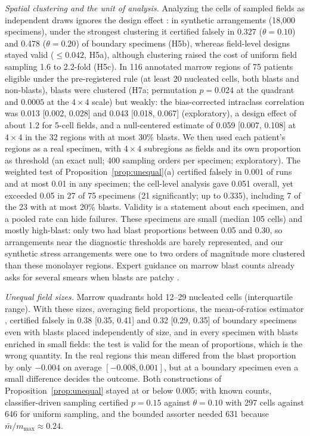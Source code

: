 \documentclass[journal]{IEEEtran}
\begin{document}
\emph{Spatial clustering and the unit of analysis.} Analyzing the cells of sampled fields as independent draws ignores the design effect \cite{kish1965}: in synthetic arrangements (18,000 specimens), under the strongest clustering it certified falsely in 0.327 ($\theta=0.10$) and 0.478 ($\theta=0.20$) of boundary specimens (H5b), whereas field-level designs stayed valid ($\le0.042$, H5a), although clustering raised the cost of uniform field sampling 1.6 to 2.2-fold (H5c). In 116 annotated marrow regions of 75 patients eligible under the pre-registered rule (at least 20 nucleated cells, both blasts and non-blasts), blasts were clustered (H7a; permutation $p=0.024$ at the quadrant and $0.0005$ at the $4\times4$ scale) but weakly: the bias-corrected intraclass correlation was 0.013 [0.002, 0.028] and 0.043 [0.018, 0.067] (exploratory), a design effect of about 1.2 for 5-cell fields, and a null-centered estimate of 0.059 [0.007, 0.108] at $4\times4$ in the 32 regions with at most 30\% blasts. We then used each patient's regions as a real specimen, with $4\times4$ subregions as fields and its own proportion as threshold (an exact null; 400 sampling orders per specimen; exploratory). The weighted test of Proposition~\ref{prop:unequal}(a) certified falsely in 0.001 of runs and at most 0.01 in any specimen; the cell-level analysis gave 0.051 overall, yet exceeded 0.05 in 27 of 75 specimens (21 significantly; up to 0.335), including 7 of the 23 with at most 20\% blasts. Validity is a statement about each specimen, and a pooled rate can hide failures. These specimens are small (median 105 cells) and mostly high-blast: only two had blast proportions between 0.05 and 0.30, so arrangements near the diagnostic thresholds are barely represented, and our synthetic stress arrangements were one to two orders of magnitude more clustered than these monolayer regions. Expert guidance on marrow blast counts already asks for several smears when blasts are patchy \cite{wang2026ehaeln}.

\emph{Unequal field sizes.} Marrow quadrants hold 12--29 nucleated cells (interquartile range). With these sizes, averaging field proportions, the mean-of-ratios estimator \cite{cochran1977}, certified falsely in 0.38 [0.35, 0.41] and 0.32 [0.29, 0.35] of boundary specimens even with blasts placed independently of size, and in every specimen with blasts enriched in small fields: the test is valid for the mean of proportions, which is the wrong quantity. In the real regions this mean differed from the blast proportion by only $-0.004$ on average $[-0.008,0.001]$, but at a boundary specimen even a small difference decides the outcome. Both constructions of Proposition~\ref{prop:unequal} stayed at or below 0.005; with known counts, classifier-driven sampling certified $p=0.15$ against $\theta=0.10$ with 297 cells against 646 for uniform sampling, and the bounded assorter needed 631 because $\bar m/m_{\max}\approx0.24$.
\end{document}
